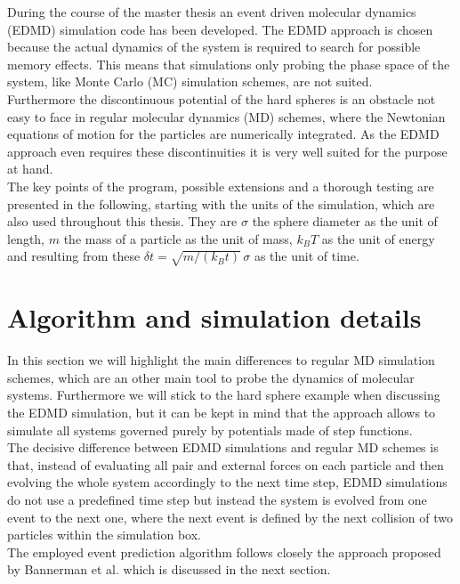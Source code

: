 
\label{chp:simulation}
During the course of the master thesis an event driven molecular dynamics (EDMD) simulation code has been developed. The EDMD approach is chosen because the actual dynamics of the system is required to search for possible memory effects. This means that simulations only probing the phase space of the system, like Monte Carlo (MC) simulation schemes, are not suited.\\ 
Furthermore the discontinuous potential of the hard spheres is an obstacle not easy to face in regular molecular dynamics (MD) schemes, where the Newtonian equations of motion for the particles are numerically integrated. As the EDMD approach even requires these discontinuities it is very well suited for the purpose at hand.\\ 
The key points of the program, possible extensions and a thorough testing are presented in the following, starting with the units of the simulation, which are also used throughout this thesis. They are $\sigma$ the sphere diameter as the unit of length, $m$ the mass of a particle as the unit of mass, $k_B T$ as the unit of energy and resulting from these $\delta t = \sqrt{m / (k_B t)} \, \sigma$ as the unit of time.

\section{Algorithm and simulation details}
\label{sec:simulation}
In this section we will highlight the main differences to regular MD simulation schemes, which are an other main tool to probe the dynamics of molecular systems. Furthermore we will stick to the hard sphere example when discussing the EDMD simulation, but it can be kept in mind that the approach allows to simulate all systems governed purely by potentials made of step functions.\\
 
The decisive difference between EDMD simulations and regular MD schemes is that, instead of evaluating all pair and external forces on each particle and then evolving the whole system accordingly to the next time step, EDMD simulations do not use a predefined time step but instead the system is evolved from one event to the next one, where the next event is defined by the next collision of two particles within the simulation box.\\

The employed event prediction algorithm follows closely the approach proposed by Bannerman et al.\cite{Bannerman2014} which is discussed in the next section.

